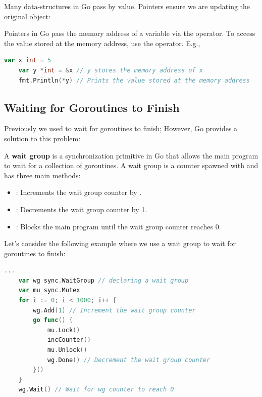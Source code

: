 \noindent
Many data-structures in Go pass by value. Pointers ensure we are updating the original object:
\begin{Def}

    Pointers in Go pass the memory address of a variable via the \snippet{\&} operator. To access the value stored at the memory address, use the \snippet{*} operator. E.g.,
    \begin{lstlisting}[language=Go, numbers=none]
    var x int = 5
    var y *int = &x // y stores the memory address of x
    fmt.Println(*y) // Prints the value stored at the memory address
    \end{lstlisting}
\end{Def}

\newpage 

\subsection{Waiting for Goroutines to Finish}
\noindent
Previously we used  to wait for goroutines to finish; However, Go provides a solution to this problem:

\begin{Def}

    A \textbf{wait group} is a synchronization primitive in Go that allows the main program to wait for a collection of goroutines. 
    A wait group is a counter spawned with  and has three main methods:
    \begin{itemize}
        \item {}: Increments the wait group counter by .
        \item {}: Decrements the wait group counter by 1.
        \item {}: Blocks the main program until the wait group counter reaches 0.
    \end{itemize}
\end{Def}

\begin{Example}

    \label{ex:waitgroup}
    Let's consider the following example where we use a wait group to wait for goroutines to finish:
    \begin{lstlisting}[language=Go, numbers=none]
    ...
    var wg sync.WaitGroup // declaring a wait group
    var mu sync.Mutex 
    for i := 0; i < 1000; i++ {
        wg.Add(1) // Increment the wait group counter
        go func() {
            mu.Lock()
            incCounter()
            mu.Unlock()
            wg.Done() // Decrement the wait group counter
        }()
    }
    wg.Wait() // Wait for wg counter to reach 0
    \end{lstlisting}
    \noindent
\end{Example}


